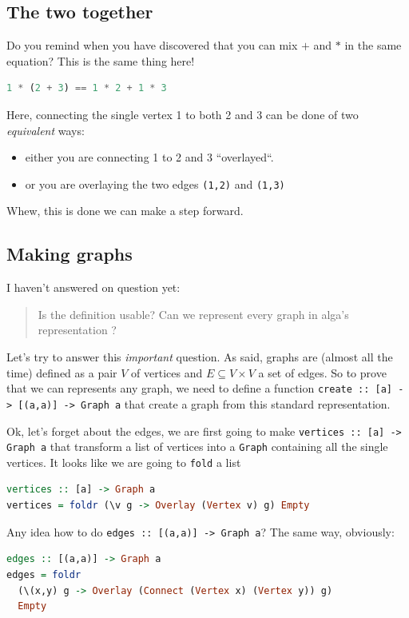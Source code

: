\documentclass[10pt,a4paper]{article}
\begin{document}
\subsection{The two together}
Do you remind when you have discovered that you can mix $+$ and $*$ in the same equation? This is the same thing here!
\begin{lstlisting}[language=Haskell, frame=single]
1 * (2 + 3) == 1 * 2 + 1 * 3
\end{lstlisting}
Here, connecting the single vertex 1 to both 2 and 3 can be done of two \emph{equivalent} ways:
\begin{itemize}
	\item either you are connecting 1 to 2 and 3 ``overlayed``.
	\item or you are overlaying the two edges \verb|(1,2)| and \verb|(1,3)|
\end{itemize}

Whew, this is done we can  make a step forward.

\subsection{Making graphs}
I haven't answered on question yet:
\begin{quote}
	Is the definition usable? Can we represent every graph in alga's representation ?
\end{quote}

Let's try to answer this \emph{important} question. As said, graphs are (almost all the time) defined as a pair $V$ of vertices and $E \subseteq V \times V$ a set of edges. So to prove that we can represents any graph, we need to define a function \verb|create :: [a] -> [(a,a)] -> Graph a| that create a graph from this standard representation.

Ok, let's forget about the edges, we are first going to make \verb|vertices :: [a] -> Graph a| that transform a list of vertices into a \verb|Graph| containing all the single vertices. It looks like we are going to \verb|fold| a list

\begin{lstlisting}[language=Haskell, frame=single]
vertices :: [a] -> Graph a
vertices = foldr (\v g -> Overlay (Vertex v) g) Empty
\end{lstlisting}

Any idea how to do \verb|edges :: [(a,a)] -> Graph a|? The same way, obviously:

\begin{lstlisting}[language=Haskell, frame=single]
edges :: [(a,a)] -> Graph a
edges = foldr
  (\(x,y) g -> Overlay (Connect (Vertex x) (Vertex y)) g)
  Empty
\end{lstlisting}
\end{document}
